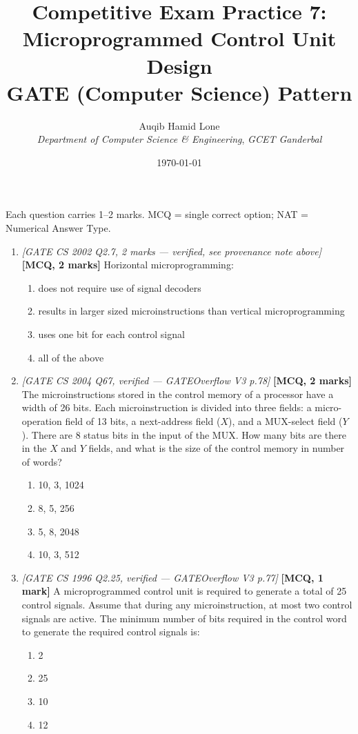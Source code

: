 \documentclass[11pt]{article}
\title{Competitive Exam Practice 7: Microprogrammed Control Unit Design\\\large GATE (Computer Science) Pattern}
\author{Auqib Hamid Lone\\[0.3em]
  \emph{Department of Computer Science \& Engineering}, \emph{GCET Ganderbal}}
\date{\today}
\begin{document}
\maketitle

\noindent Each question carries 1--2 marks. MCQ = single correct option; NAT = Numerical Answer Type.

\begin{enumerate}
\item[\textbf{Q1}] \textit{[GATE CS 2002 Q2.7, 2 marks --- verified, see provenance note above]} \textbf{[MCQ, 2 marks]} Horizontal microprogramming:
\begin{enumerate}
  \item[(A)] does not require use of signal decoders
  \item[(B)] results in larger sized microinstructions than vertical microprogramming
  \item[(C)] uses one bit for each control signal
  \item[(D)] all of the above
\end{enumerate}

\item[\textbf{Q2}] \textit{[GATE CS 2004 Q67, verified --- GATEOverflow V3 p.78]} \textbf{[MCQ, 2 marks]} The microinstructions stored in the control memory of a processor have a width of 26 bits. Each microinstruction is divided into three fields: a micro-operation field of 13 bits, a next-address field ($X$), and a MUX-select field ($Y$). There are 8 status bits in the input of the MUX. How many bits are there in the $X$ and $Y$ fields, and what is the size of the control memory in number of words?
\begin{enumerate}
  \item[(A)] 10, 3, 1024
  \item[(B)] 8, 5, 256
  \item[(C)] 5, 8, 2048
  \item[(D)] 10, 3, 512
\end{enumerate}

\item[\textbf{Q3}] \textit{[GATE CS 1996 Q2.25, verified --- GATEOverflow V3 p.77]} \textbf{[MCQ, 1 mark]} A microprogrammed control unit is required to generate a total of 25 control signals. Assume that during any microinstruction, at most two control signals are active. The minimum number of bits required in the control word to generate the required control signals is:
\begin{enumerate}
  \item[(A)] 2
  \item[(B)] 25
  \item[(C)] 10
  \item[(D)] 12
\end{enumerate}


\end{enumerate}
\end{document}
